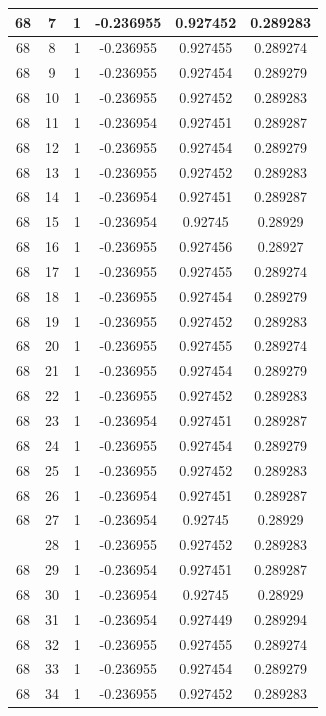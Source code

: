 \documentclass[12pt,a4paper]{article}
\numberwithin{equation}{section}
\numberwithin{figure}{section}
\numberwithin{table}{section}
\begin{document}
\begin{longtable}{|c|c|c|c|c|c|}
68 & 7 & 1 & -0.236955 & 0.927452 & 0.289283 \\ \hline
68 & 8 & 1 & -0.236955 & 0.927455 & 0.289274 \\ \hline
68 & 9 & 1 & -0.236955 & 0.927454 & 0.289279 \\ \hline
68 & 10 & 1 & -0.236955 & 0.927452 & 0.289283 \\ \hline
68 & 11 & 1 & -0.236954 & 0.927451 & 0.289287 \\ \hline
68 & 12 & 1 & -0.236955 & 0.927454 & 0.289279 \\ \hline
68 & 13 & 1 & -0.236955 & 0.927452 & 0.289283 \\ \hline
68 & 14 & 1 & -0.236954 & 0.927451 & 0.289287 \\ \hline
68 & 15 & 1 & -0.236954 & 0.92745 & 0.28929 \\ \hline
68 & 16 & 1 & -0.236955 & 0.927456 & 0.28927 \\ \hline
68 & 17 & 1 & -0.236955 & 0.927455 & 0.289274 \\ \hline
68 & 18 & 1 & -0.236955 & 0.927454 & 0.289279 \\ \hline
68 & 19 & 1 & -0.236955 & 0.927452 & 0.289283 \\ \hline
68 & 20 & 1 & -0.236955 & 0.927455 & 0.289274 \\ \hline
68 & 21 & 1 & -0.236955 & 0.927454 & 0.289279 \\ \hline
68 & 22 & 1 & -0.236955 & 0.927452 & 0.289283 \\ \hline
68 & 23 & 1 & -0.236954 & 0.927451 & 0.289287 \\ \hline
68 & 24 & 1 & -0.236955 & 0.927454 & 0.289279 \\ \hline
68 & 25 & 1 & -0.236955 & 0.927452 & 0.289283 \\ \hline
68 & 26 & 1 & -0.236954 & 0.927451 & 0.289287 \\ \hline
68 & 27 & 1 & -0.236954 & 0.92745 & 0.28929 \\ \hline
\pagebreak
68 & 28 & 1 & -0.236955 & 0.927452 & 0.289283 \\ \hline
68 & 29 & 1 & -0.236954 & 0.927451 & 0.289287 \\ \hline
68 & 30 & 1 & -0.236954 & 0.92745 & 0.28929 \\ \hline
68 & 31 & 1 & -0.236954 & 0.927449 & 0.289294 \\ \hline
68 & 32 & 1 & -0.236955 & 0.927455 & 0.289274 \\ \hline
68 & 33 & 1 & -0.236955 & 0.927454 & 0.289279 \\ \hline
68 & 34 & 1 & -0.236955 & 0.927452 & 0.289283 \\ \hline

\end{longtable}
\end{document}

